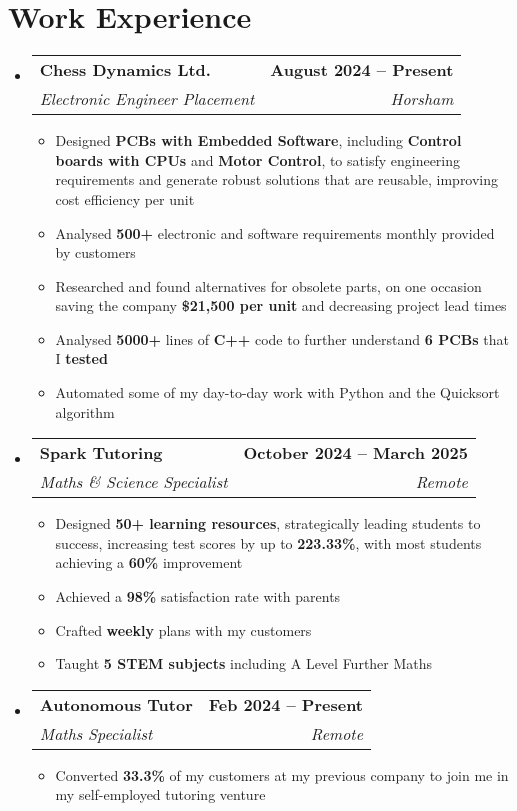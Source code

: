 \documentclass[letterpaper,11pt]{article}
\makeatletter
\newcommand{\resumeItem}[1]{
  \item\small{
    {#1 \vspace{0pt}}
  }
}
\newcommand{\resumeSubheading}[4]{
  \vspace{-2pt}\item
    \begin{tabular*}{1.0\textwidth}[t]{l@{\extracolsep{\fill}}r}
      \textbf{#1} & \textbf{\small #2} \\
      \textit{\small#3} & \textit{\small #4} \\
    \end{tabular*}\vspace{-7pt}
}
\newcommand{\resumeSubHeadingListStart}{\begin{itemize}[leftmargin=0.0in, label={}]}
\newcommand{\resumeSubHeadingListEnd}{\end{itemize}}\vspace{0pt}
\newcommand{\resumeItemListStart}{\begin{itemize}}
\newcommand{\resumeItemListEnd}{\end{itemize}\vspace{-5pt}}
\makeatother
\begin{document}
\section{Work Experience}
    \resumeSubHeadingListStart
                \resumeSubheading{Chess Dynamics Ltd.}{August 2024 -- Present}{Electronic Engineer Placement}{Horsham} 
                \resumeItemListStart
                    \resumeItem{Designed \textbf{PCBs with Embedded Software}, including \textbf{Control boards with CPUs} and \textbf{Motor Control}, to satisfy engineering requirements and generate robust solutions that are reusable, improving cost efficiency per unit}
                    \resumeItem{Analysed \textbf{500+} electronic and software requirements monthly provided by customers}
                    \resumeItem{Researched and found alternatives for obsolete parts, on one occasion saving the company \textbf{\$21,500 per unit} and decreasing project lead times}
                    \resumeItem{Analysed \textbf{5000+} lines of \textbf{C++} code to further understand \textbf{6 PCBs} that I \textbf{tested}}
                    \resumeItem{Automated some of my day-to-day work with Python and the Quicksort algorithm}
                    \resumeItemListEnd
            \resumeSubheading{Spark Tutoring}{October 2024 -- March 2025}{Maths \& Science Specialist}{Remote} 
                \resumeItemListStart
                    \resumeItem{Designed \textbf{50+ learning resources}, strategically leading students to success, increasing test scores by up to \textbf{223.33\%}, with most students achieving a \textbf{60\%} improvement}
                    \resumeItem{Achieved a \textbf{98\%} satisfaction rate with parents}
                    \resumeItem{Crafted \textbf{weekly} plans with my customers}
                    \resumeItem{Taught \textbf{5 STEM subjects} including A Level Further Maths}
                    \resumeItemListEnd
            \resumeSubheading{Autonomous Tutor}{Feb 2024 -- Present}{Maths Specialist}{Remote}
                \resumeItemListStart
                    \resumeItem{Converted \textbf{33.3\%} of my customers at my previous company to join me in my self-employed tutoring venture}
                    \resumeItemListEnd
    \resumeSubHeadingListEnd
    \vspace{-12pt}

\end{document}

